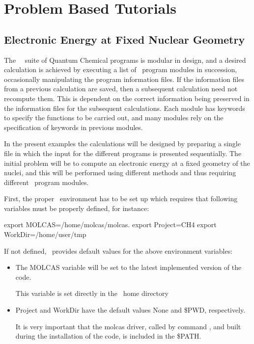 
\chapter{Problem Based Tutorials}


\section{Electronic Energy at Fixed Nuclear Geometry}

The \molcas\ \molcasversion\ suite of Quantum Chemical programs is modular in
design, and a desired calculation is achieved by executing a list of
\molcas\ program modules in succession, occasionally manipulating
the program information files. If the information files from a previous
calculation are saved, then a subsequent calculation need not recompute
them.  This is dependent on the correct information being preserved in
the information files for the subsequent calculations. Each module has keywords 
to specify the functions to be carried out, and many modules rely on the
specification of keywords in previous modules.

In the present examples the calculations will be designed by preparing
a single file in which the input for the different programs is presented
sequentially. The initial problem will be to compute an electronic energy
at a fixed geometry of the nuclei, and this will be performed using different
methods and thus requiring different \molcas\ program modules.

First, the proper \molcas\ environment has to be set up which requires that 
following variables must be properly defined, for instance:

\begin{inputlisting}
export MOLCAS=/home/molcas/molcas.\molcasversion
export Project=CH4
export WorkDir=/home/user/tmp
\end{inputlisting}

If not defined, \molcas\ provides default values for the above environment variables:
\begin{itemize}
\item The {MOLCAS} variable will be set to the latest implemented version of the code.

This variable is set directly in the \molcas\ home directory 

\item Project and WorkDir have the default values None and \$PWD, respectively.

It is very important that the molcas driver, called by command ,
and built during the installation of the code, is included in the \$PATH.
\end{itemize}

